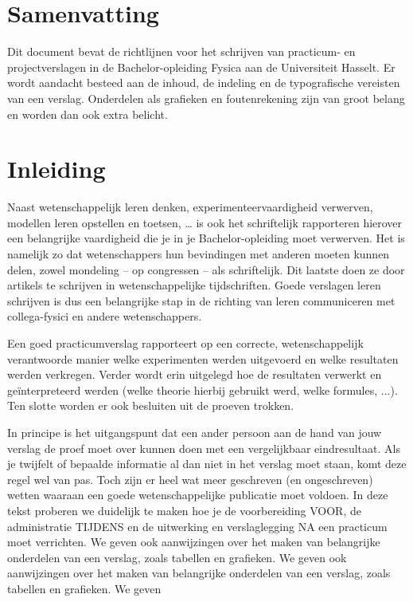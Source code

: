 \section{Samenvatting}
Dit document bevat de richtlijnen voor het schrijven van practicum- en projectverslagen in de Bachelor-opleiding Fysica aan de Universiteit Hasselt. Er wordt aandacht besteed aan de inhoud, de indeling en de typografische vereisten van een verslag. Onderdelen als grafieken en foutenrekening zijn van groot belang en worden dan ook extra belicht.

\section{Inleiding}
Naast wetenschappelijk leren denken, experimenteervaardigheid verwerven, modellen leren opstellen en toetsen, … is ook het schriftelijk rapporteren hierover een belangrijke vaardigheid die je in je Bachelor-opleiding moet verwerven. Het is namelijk zo dat wetenschappers hun bevindingen met anderen moeten kunnen delen, zowel mondeling – op congressen – als schriftelijk. Dit laatste doen ze door artikels te schrijven in wetenschappelijke tijdschriften. Goede verslagen leren schrijven is dus een belangrijke stap in de richting van leren communiceren met collega-fysici en andere wetenschappers.

Een goed practicumverslag rapporteert op een correcte, wetenschappelijk verantwoorde manier welke experimenten werden uitgevoerd en welke resultaten werden verkregen. Verder wordt erin uitgelegd hoe de resultaten verwerkt en geïnterpreteerd werden (welke theorie hierbij gebruikt werd, welke formules, ...). Ten slotte worden er ook besluiten uit de proeven trokken.


In principe is het uitgangspunt dat een ander persoon aan de hand van jouw verslag de proef moet over kunnen doen met een vergelijkbaar eindresultaat. 
Als je twijfelt of bepaalde informatie al dan niet in het verslag moet staan, komt deze regel wel van pas.
Toch zijn er heel wat meer geschreven (en ongeschreven) wetten waaraan een goede wetenschappelijke publicatie moet voldoen. 
In deze tekst proberen we duidelijk te maken hoe je de voorbereiding VOOR, de administratie TIJDENS en de uitwerking en verslaglegging NA een practicum moet verrichten. 
We geven ook aanwijzingen over het maken van belangrijke onderdelen van een verslag, zoals tabellen en grafieken.
We geven ook aanwijzingen over het maken van belangrijke onderdelen van een verslag, zoals tabellen en grafieken. 
We geven
